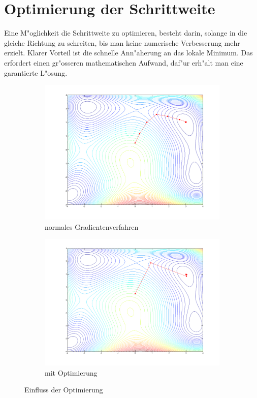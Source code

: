 \section{Optimierung der Schrittweite}
Eine M"oglichkeit die Schrittweite zu optimieren, besteht darin,
solange in die gleiche Richtung zu schreiten, bis man keine numerische
Verbesserung mehr erzielt.
Klarer Vorteil ist die schnelle Ann"aherung an das lokale Minimum.
Das erfordert einen gr"osseren mathematischen Aufwand, daf"ur erh"alt
man eine garantierte L"osung.

\begin{figure}[htb]
\centering
\begin{subfigure}[b]{0.49\textwidth}
\centering
\includegraphics[width=\textwidth]{descent/const_a.png}
\caption{normales Gradientenverfahren}\label{vergleich_a}
\end{subfigure} \begin{subfigure}[b]{0.49\textwidth}
\centering
\includegraphics[width=\textwidth]{descent/rw_1.png}
\caption{mit Optimierung}\label{vergleich_b}
\end{subfigure}
\caption{Einfluss der Optimierung}
\end{figure}


